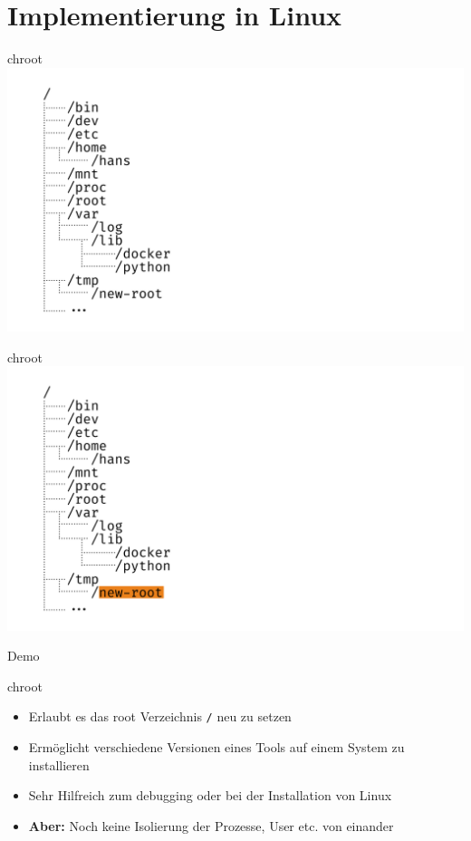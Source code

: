 \documentclass{beamer}
\begin{document}
  \section{Implementierung in Linux}
  \begin{frame}{chroot}
    \includegraphics[width=\textwidth]{fs-tree}
  \end{frame}
  \begin{frame}{chroot}
    \includegraphics[width=\textwidth]{fs-tree-highlight}
  \end{frame}
  \begin{frame}[standout]
    Demo
  \end{frame}
  \begin{frame}{chroot}
    \begin{itemize}
      \item Erlaubt es das root Verzeichnis \texttt{/} neu zu setzen
      \item Ermöglicht verschiedene Versionen eines Tools auf einem System zu installieren
      \item Sehr Hilfreich zum debugging oder bei der Installation von Linux
      \item \textbf{Aber:} Noch keine Isolierung der Prozesse, User etc. von einander
    \end{itemize}
  \end{frame}
  
\end{document}
